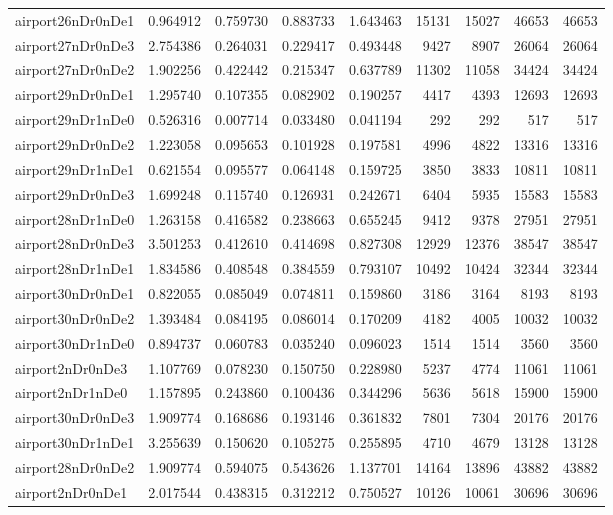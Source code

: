 \begin{longtable}{|l|r|r|r|r|r|r|r|r|}
airport26nDr0nDe1 & 0.964912 & 0.759730 & 0.883733 & 1.643463 & 15131 & 15027 & 46653 & 46653 \\
airport27nDr0nDe3 & 2.754386 & 0.264031 & 0.229417 & 0.493448 & 9427 & 8907 & 26064 & 26064 \\
airport27nDr0nDe2 & 1.902256 & 0.422442 & 0.215347 & 0.637789 & 11302 & 11058 & 34424 & 34424 \\
airport29nDr0nDe1 & 1.295740 & 0.107355 & 0.082902 & 0.190257 & 4417 & 4393 & 12693 & 12693 \\
airport29nDr1nDe0 & 0.526316 & 0.007714 & 0.033480 & 0.041194 & 292 & 292 & 517 & 517 \\
airport29nDr0nDe2 & 1.223058 & 0.095653 & 0.101928 & 0.197581 & 4996 & 4822 & 13316 & 13316 \\
airport29nDr1nDe1 & 0.621554 & 0.095577 & 0.064148 & 0.159725 & 3850 & 3833 & 10811 & 10811 \\
airport29nDr0nDe3 & 1.699248 & 0.115740 & 0.126931 & 0.242671 & 6404 & 5935 & 15583 & 15583 \\
airport28nDr1nDe0 & 1.263158 & 0.416582 & 0.238663 & 0.655245 & 9412 & 9378 & 27951 & 27951 \\
airport28nDr0nDe3 & 3.501253 & 0.412610 & 0.414698 & 0.827308 & 12929 & 12376 & 38547 & 38547 \\
airport28nDr1nDe1 & 1.834586 & 0.408548 & 0.384559 & 0.793107 & 10492 & 10424 & 32344 & 32344 \\
airport30nDr0nDe1 & 0.822055 & 0.085049 & 0.074811 & 0.159860 & 3186 & 3164 & 8193 & 8193 \\
airport30nDr0nDe2 & 1.393484 & 0.084195 & 0.086014 & 0.170209 & 4182 & 4005 & 10032 & 10032 \\
airport30nDr1nDe0 & 0.894737 & 0.060783 & 0.035240 & 0.096023 & 1514 & 1514 & 3560 & 3560 \\
airport2nDr0nDe3 & 1.107769 & 0.078230 & 0.150750 & 0.228980 & 5237 & 4774 & 11061 & 11061 \\
airport2nDr1nDe0 & 1.157895 & 0.243860 & 0.100436 & 0.344296 & 5636 & 5618 & 15900 & 15900 \\
airport30nDr0nDe3 & 1.909774 & 0.168686 & 0.193146 & 0.361832 & 7801 & 7304 & 20176 & 20176 \\
airport30nDr1nDe1 & 3.255639 & 0.150620 & 0.105275 & 0.255895 & 4710 & 4679 & 13128 & 13128 \\
airport28nDr0nDe2 & 1.909774 & 0.594075 & 0.543626 & 1.137701 & 14164 & 13896 & 43882 & 43882 \\
airport2nDr0nDe1 & 2.017544 & 0.438315 & 0.312212 & 0.750527 & 10126 & 10061 & 30696 & 30696 \\

\end{longtable}
